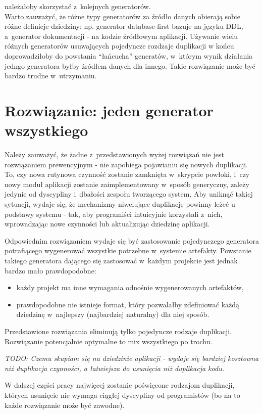należałoby skorzystać z~kolejnych generatorów.\\


Warto zauważyć, że różne typy generatorów za źródło danych obierają sobie różne definicje dziedziny: np. generator database-first bazuje na języku DDL, a~generator dokumentacji - na kodzie źródłowym aplikacji.
Używanie wielu różnych generatorów usuwających pojedyncze rozdzaje duplikacji w końcu doprowadziłoby do powstania ``łańcucha'' generatów, w~którym wynik działania jedngo generatora byłby źródłem danych dla innego.
Takie rozwiązanie może być bardzo trudne w~utrzymaniu.



\section{Rozwiązanie: jeden generator wszystkiego}

Należy zauważyć, że żadne z~przedstawionych wyżej rozwiązań nie jest rozwiązaniem prewencyjnym - nie zapobiega pojawianiu się nowych duplikacji.
To, czy nowa rutynowa czynność zostanie zamknięta w~skrypcie powłoki, i~czy nowy moduł aplikacji zostanie zaimplementowany w~sposób generyczny, zależy jedynie od dyscypliny i~dbałości zespołu tworzącego system.
Aby uniknąć takiej sytuacji, wydaje się, że mechanizmy niwelujące duplikację powinny leżeć u podstawy systemu - tak, aby programiści intuicyjnie korzystali z~nich, wprowadzając nowe czynności lub aktualizując dziedzinę aplikacji.

Odpowiednim rozwiązaniem wydaje się być zastosowanie pojedynczego generatora potrafiącego wygenerować wszystkie potrzebne w~systemie artefakty.
Powstanie takiego generatora dającego się zastosować w~każdym projekcie jest jednak bardzo mało prawdopodobne:

\begin{itemize}
 \item każdy projekt ma inne wymagania odnośnie wygenerowanych artefaktów,
 \item prawdopodobne nie istnieje format, który pozwalałby zdefiniować każdą dziedzinę w~najlepszy (najbardziej naturalny) dla niej sposób.
\end{itemize}



Przedstawione rozwiązania eliminują tylko pojedyncze rodzaje duplikacji.
Rozwiązanie potencjalnie optymalne to mix wszystkiego po trochu.

\emph{TODO: Czemu skupiam się na dziedzinie aplikacji - wydaje się bardziej kosztowna niż duplikacja czynności, a łatwiejsza do usunięcia niż duplikacja kodu.}

W dalszej części pracy najwięcej zostanie poświęcone rodzajom duplikacji, których usunięcie nie wymaga ciągłej dyscypliny od programistów (bo na to każde rozwiązanie może być zawodne).
